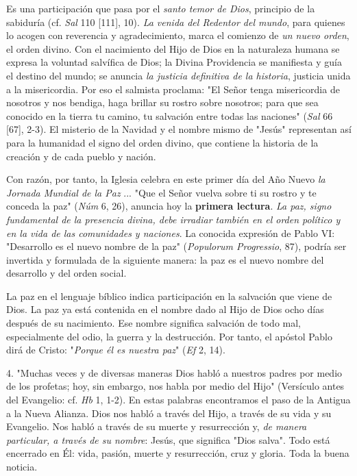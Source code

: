 \begin{body}
Es una participación que pasa por el \emph{santo temor de Dios}, principio de la sabiduría (cf. \emph{Sal} 110 {[}111{]}, 10). \emph{La venida del Redentor del mundo}, para quienes lo acogen con reverencia y agradecimiento, marca el comienzo de \emph{un nuevo orden}, el orden divino. Con el nacimiento del Hijo de Dios en la naturaleza humana se expresa la voluntad salvífica de Dios; la Divina Providencia se manifiesta y guía el destino del mundo; se anuncia \emph{la justicia definitiva de la historia}, justicia unida a la misericordia. Por eso el salmista proclama: "El Señor tenga misericordia de nosotros y nos bendiga, haga brillar su rostro sobre nosotros; para que sea conocido en la tierra tu camino, tu salvación entre todas las naciones" (\emph{Sal} 66 {[}67{]}, 2-3). El misterio de la Navidad y el nombre mismo de "Jesús" representan así para la humanidad el signo del orden divino, que contiene la historia de la creación y de cada pueblo y nación.

Con razón, por tanto, la Iglesia celebra en este primer día del Año Nuevo \emph{la Jornada Mundial de la Paz} ... "Que el Señor vuelva sobre ti su rostro y te conceda la paz" (\emph{Núm} 6, 26), anuncia hoy la \textbf{primera lectura}. \emph{La paz, signo fundamental de la presencia divina, debe irradiar también en el orden político y en la vida de las comunidades y naciones}. La conocida expresión de Pablo VI: "Desarrollo es el nuevo nombre de la paz" (\emph{Populorum Progressio}, 87), podría ser invertida y formulada de la siguiente manera: la paz es el nuevo nombre del desarrollo y del orden social.

La paz en el lenguaje bíblico indica participación en la salvación que viene de Dios. La paz ya está contenida en el nombre dado al Hijo de Dios ocho días después de su nacimiento. Ese nombre significa salvación de todo mal, especialmente del odio, la guerra y la destrucción. Por tanto, el apóstol Pablo dirá de Cristo: "\emph{Porque él es nuestra paz}" (\emph{Ef} 2, 14).

4. "Muchas veces y de diversas maneras Dios habló a nuestros padres por medio de los profetas; hoy, sin embargo, nos habla por medio del Hijo" (Versículo antes del Evangelio: cf. \emph{Hb} 1, 1-2). En estas palabras encontramos el paso de la Antigua a la Nueva Alianza. Dios nos habló a través del Hijo, a través de su vida y su Evangelio. Nos habló a través de su muerte y resurrección y, \emph{de manera particular, a través de su nombre}: Jesús, que significa "Dios salva". Todo está encerrado en Él: vida, pasión, muerte y resurrección, cruz y gloria. Toda la buena noticia.


\end{body}
